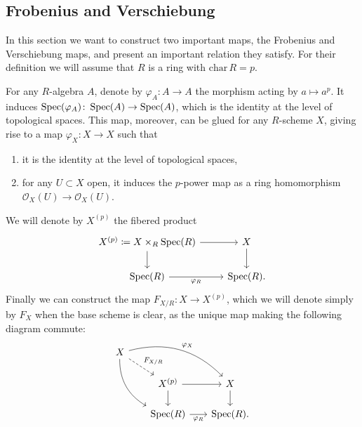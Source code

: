 \subsection{Frobenius and Verschiebung}\label{sec:FrobeniusVerschiebung}
In this section we want to construct two important maps, the Frobenius and Verschiebung maps,
and present an important relation they satisfy.
For their definition we will assume that $R$ is a ring with $\mathrm{char}\, R = p$.


\begin{defn}[]
	For any $R$-algebra $A$,
	denote by $\varphi_A\colon A \to A$ the morphism
	acting by $a \mapsto a^p$.
	It induces $\operatorname{Spec}(\varphi_A)\colon \operatorname{Spec}(A) \to \operatorname{Spec}(A)$,
	which is the identity at the level of topological spaces.
	This map, moreover, can be glued for any $R$-scheme $X$, giving rise to a map
	$\varphi_X\colon X \to X$ such that
\begin{enumerate}
	\item it is the identity at the level of topological spaces,
	\item for any $U \subset X$ open, it induces the $p$-power map
		as a ring homomorphism $\mathcal{O}_{X}(U) \to \mathcal{O}_{ X }(U)$.
\end{enumerate}
	We will denote by $X^{(p)}$ the fibered product
	\begin{equation*}
	\begin{tikzcd}
		X^{(p)} \coloneqq X \times_{ R } \spec(R) \arrow[r, "", rightarrow] 
		\arrow[d, "", rightarrow] &
		X \arrow[d, "", rightarrow] \\
		\spec(R) \arrow[r, "\varphi_R"', rightarrow] &
		\spec(R)
	.\end{tikzcd}
	\end{equation*}
	Finally we can construct the map $F_{X/R} \colon X \to X^{(p)}$,
	which we will denote simply by $F_X$ when the base scheme is clear,
	as the unique map making the following diagram commute:
	\begin{equation*}
	\begin{tikzcd}[row sep=1.6em, column sep=1.8em]
		X \arrow[rrd, "\varphi_X", rightarrow, bend left] 
		\arrow[rdd, "", rightarrow, bend right, end anchor=north west]
		\arrow[rd, "F_{X/R}", dashrightarrow] & & \\
		&
		X^{(p)} \arrow[r, "", rightarrow] 
		\arrow[d, "", rightarrow] &
		X \arrow[d, "", rightarrow] \\
		&
		\spec(R) \arrow[r, "\varphi_R"', rightarrow] &
		\spec(R)
	.\end{tikzcd}
	\end{equation*}
\end{defn}


